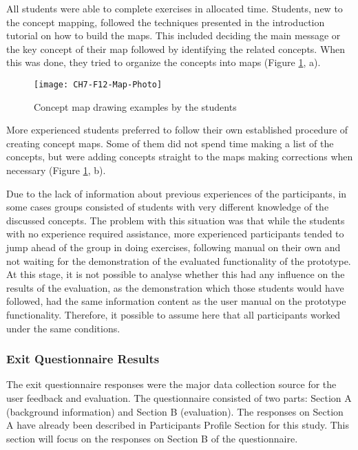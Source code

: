 All students were able to complete exercises in allocated time. Students, new to
the concept mapping, followed the techniques presented in the introduction
tutorial on how to build the maps. This included deciding the main message or
the key concept of their map followed by identifying the related concepts. When
this was done, they tried to organize the concepts into maps (Figure
\ref{fig:study2maps}, a).

\begin{figure}[htb]
\centering
\texttt{[image: CH7-F12-Map-Photo]}
\caption{Concept map drawing examples by the students}
\label{fig:study2maps}
\end{figure}

More experienced students preferred to follow their own established procedure of
creating concept maps. Some of them did not spend time making a list of the
concepts, but were adding concepts straight to the maps making corrections when
necessary (Figure \ref{fig:study2maps}, b).

Due to the lack of information about previous experiences of the participants,
in some cases groups consisted of students with very different knowledge of the
discussed concepts. The problem with this situation was that while the students
with no experience required assistance, more experienced participants tended to
jump ahead of the group in doing exercises, following manual on their own and
not waiting for the demonstration of the evaluated functionality of the
prototype. At this stage, it is not possible to analyse whether this had any
influence on the results of the evaluation, as the demonstration which those
students would have followed, had the same information content as the user
manual on the prototype functionality. Therefore, it possible to assume here
that all participants worked under the same conditions.

\subsubsection{Exit Questionnaire Results}
The exit questionnaire responses were the major data collection source for the
user feedback and evaluation. The questionnaire consisted of two parts: Section
A (background information) and Section B (evaluation). The responses on Section
A have already been described in Participants Profile Section for this study. This
section will focus on the responses on Section B of the questionnaire. 

